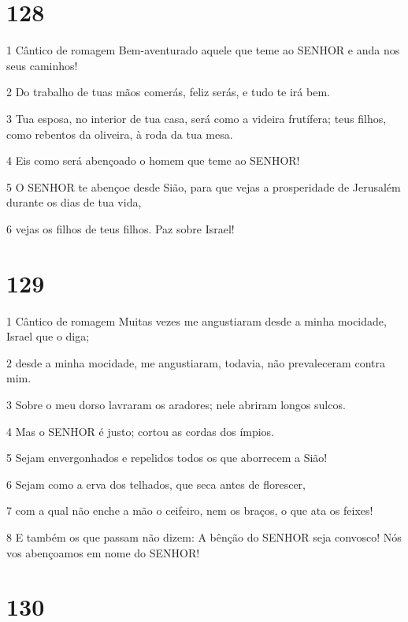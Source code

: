 \chapter{128}

\par 1 Cântico de romagem Bem-aventurado aquele que teme ao SENHOR e anda nos seus caminhos!
\par 2 Do trabalho de tuas mãos comerás, feliz serás, e tudo te irá bem.
\par 3 Tua esposa, no interior de tua casa, será como a videira frutífera; teus filhos, como rebentos da oliveira, à roda da tua mesa.
\par 4 Eis como será abençoado o homem que teme ao SENHOR!
\par 5 O SENHOR te abençoe desde Sião, para que vejas a prosperidade de Jerusalém durante os dias de tua vida,
\par 6 vejas os filhos de teus filhos. Paz sobre Israel!

\chapter{129}

\par 1 Cântico de romagem Muitas vezes me angustiaram desde a minha mocidade, Israel que o diga;
\par 2 desde a minha mocidade, me angustiaram, todavia, não prevaleceram contra mim.
\par 3 Sobre o meu dorso lavraram os aradores; nele abriram longos sulcos.
\par 4 Mas o SENHOR é justo; cortou as cordas dos ímpios.
\par 5 Sejam envergonhados e repelidos todos os que aborrecem a Sião!
\par 6 Sejam como a erva dos telhados, que seca antes de florescer,
\par 7 com a qual não enche a mão o ceifeiro, nem os braços, o que ata os feixes!
\par 8 E também os que passam não dizem: A bênção do SENHOR seja convosco! Nós vos abençoamos em nome do SENHOR!

\chapter{130}

